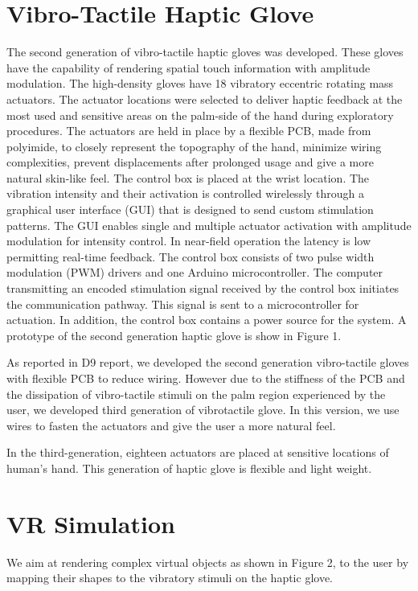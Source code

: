 \section{Vibro-Tactile Haptic Glove}
The second generation of vibro-tactile haptic gloves was developed. These gloves have the capability of rendering spatial touch information with amplitude modulation. The high-density gloves have 18 vibratory eccentric rotating mass actuators. The actuator locations were selected to deliver haptic feedback at the most used and sensitive areas on the palm-side of the hand during exploratory procedures. The actuators are held in place by a flexible PCB, made from polyimide, to closely represent the topography of the hand, minimize wiring complexities, prevent displacements after prolonged usage and give a more natural skin-like feel.
The control box is placed at the wrist location. The vibration
intensity and their activation is controlled wirelessly through a
graphical user interface (GUI) that is designed to send custom
stimulation patterns. The GUI enables single and multiple actuator
activation with amplitude modulation for intensity control. In near-field operation the latency is low permitting real-time feedback. The control box consists of two pulse width modulation (PWM) drivers and one Arduino microcontroller. The computer transmitting an encoded stimulation signal received by the control box initiates the communication pathway. This signal is sent to a microcontroller for actuation. In addition, the control box contains a power source for the system. A prototype of the second generation haptic glove is show in Figure 1. 

As reported in D9 report, we developed the second generation
vibro-tactile gloves with flexible PCB to reduce wiring. However due
to the stiffness of the PCB and the dissipation of vibro-tactile
stimuli on the palm region experienced by the user, we developed third
generation of vibrotactile glove. In this version, we use wires to
fasten the actuators and give the user a more natural feel.

In the third-generation, eighteen actuators are placed at sensitive
locations of human’s hand. This generation of haptic glove is flexible and light weight. 


\section{VR Simulation}
We aim at rendering complex virtual objects as shown in Figure 2, to
the user by mapping their shapes to the vibratory stimuli on the
haptic glove.

